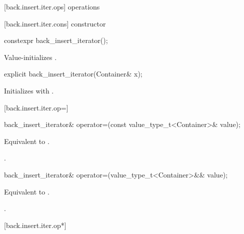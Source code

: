 [back.insert.iter.ops]{ operations}

[back.insert.iter.cons]{ constructor}

%
\begin{itemdecl}
constexpr back_insert_iterator();
\end{itemdecl}

\begin{itemdescr}
\pnum
\effects
Value-initializes
.
\end{itemdescr}

%

\begin{itemdecl}
explicit back_insert_iterator(Container& x);
\end{itemdecl}

\begin{itemdescr}
\pnum
\effects
Initializes
with .
\end{itemdescr}

[back.insert.iter.op=]{}

%
\begin{itemdecl}
back_insert_iterator&
  operator=(const value_type_t<Container>& value);
\end{itemdecl}

\begin{itemdescr}
\pnum
\effects Equivalent to
.

\pnum
\returns
{}.
\end{itemdescr}

%
\begin{itemdecl}
back_insert_iterator&
  operator=(value_type_t<Container>&& value);
\end{itemdecl}

\begin{itemdescr}
\pnum
\effects Equivalent to
.

\pnum
\returns
{}.
\end{itemdescr}

[back.insert.iter.op*]{}

